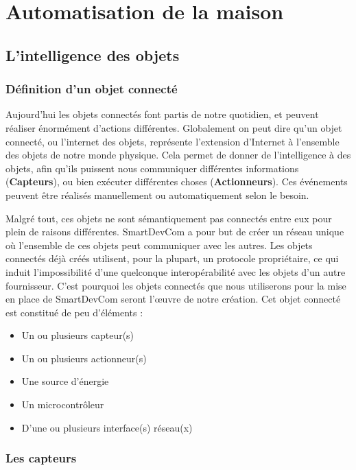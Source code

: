 ﻿\chapter{Automatisation de la maison}

\section{L’intelligence des objets}
	\subsection{Définition d’un objet connecté}
Aujourd'hui les objets connectés font partis de notre quotidien, et peuvent réaliser énormément d'actions différentes. Globalement on peut dire qu'un objet connecté, ou l'internet des objets, représente l'extension d'Internet à l'ensemble des objets de notre monde physique. Cela permet de donner de l'intelligence à des objets, afin qu'ils puissent nous communiquer différentes informations 
(\textbf{Capteurs}), ou bien exécuter différentes choses (\textbf{Actionneurs}). Ces événements peuvent être 
réalisés manuellement ou automatiquement selon le besoin.

Malgré tout, ces objets ne sont sémantiquement pas connectés entre eux pour plein de raisons différentes. 
SmartDevCom a pour but de créer un réseau unique où l'ensemble de ces objets peut communiquer avec les 
autres. Les objets connectés déjà créés utilisent, pour la plupart, un protocole propriétaire, ce qui induit 
l'impossibilité d'une quelconque interopérabilité avec les objets d'un autre fournisseur. C'est pourquoi les 
objets connectés que nous utiliserons pour la mise en place de SmartDevCom seront l'œuvre de notre création. 
Cet objet connecté est constitué de peu d'éléments :
\begin{itemize}
 \item Un ou plusieurs capteur(s)
 \item Un ou plusieurs actionneur(s)
 \item Une source d'énergie
 \item Un microcontrôleur
 \item D'une ou plusieurs interface(s) réseau(x)
\end{itemize}

	\subsection{Les capteurs}
	
